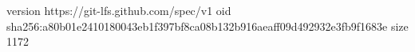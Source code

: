 version https://git-lfs.github.com/spec/v1
oid sha256:a80b01e2410180043eb1f397bf8ca08b132b916aeaff09d492932e3fb9f1683e
size 1172
